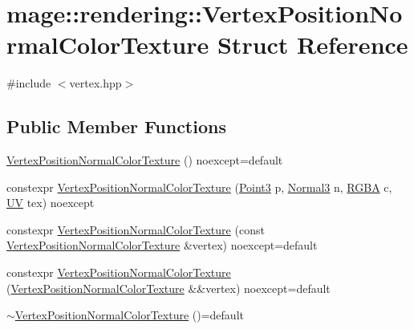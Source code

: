 \hypertarget{structmage_1_1rendering_1_1_vertex_position_normal_color_texture}{}\section{mage\+:\+:rendering\+:\+:Vertex\+Position\+Normal\+Color\+Texture Struct Reference}
\label{structmage_1_1rendering_1_1_vertex_position_normal_color_texture}


{\ttfamily \#include $<$vertex.\+hpp$>$}

\subsection*{Public Member Functions}
\begin{DoxyCompactItemize}
\item 
\mbox{\hyperlink{structmage_1_1rendering_1_1_vertex_position_normal_color_texture_a9655643724642a5d4a3f5baf85340412}{Vertex\+Position\+Normal\+Color\+Texture}} () noexcept=default
\item 
constexpr \mbox{\hyperlink{structmage_1_1rendering_1_1_vertex_position_normal_color_texture_ab3a0b3474edd41abe2339df4cd70961f}{Vertex\+Position\+Normal\+Color\+Texture}} (\mbox{\hyperlink{structmage_1_1_point3}{Point3}} p, \mbox{\hyperlink{structmage_1_1_normal3}{Normal3}} n, \mbox{\hyperlink{structmage_1_1_r_g_b_a}{R\+G\+BA}} c, \mbox{\hyperlink{structmage_1_1_u_v}{UV}} tex) noexcept
\item 
constexpr \mbox{\hyperlink{structmage_1_1rendering_1_1_vertex_position_normal_color_texture_a2794448eab99a93dc310ccd35359286d}{Vertex\+Position\+Normal\+Color\+Texture}} (const \mbox{\hyperlink{structmage_1_1rendering_1_1_vertex_position_normal_color_texture}{Vertex\+Position\+Normal\+Color\+Texture}} \&vertex) noexcept=default
\item 
constexpr \mbox{\hyperlink{structmage_1_1rendering_1_1_vertex_position_normal_color_texture_a78fbb9ec2a5c4b26ab789c966ba89e64}{Vertex\+Position\+Normal\+Color\+Texture}} (\mbox{\hyperlink{structmage_1_1rendering_1_1_vertex_position_normal_color_texture}{Vertex\+Position\+Normal\+Color\+Texture}} \&\&vertex) noexcept=default
\item 
\mbox{\hyperlink{structmage_1_1rendering_1_1_vertex_position_normal_color_texture_ac209c1c9239db1545c0c9920d6560b1d}{$\sim$\+Vertex\+Position\+Normal\+Color\+Texture}} ()=default
\item 

\end{DoxyCompactItemize}
